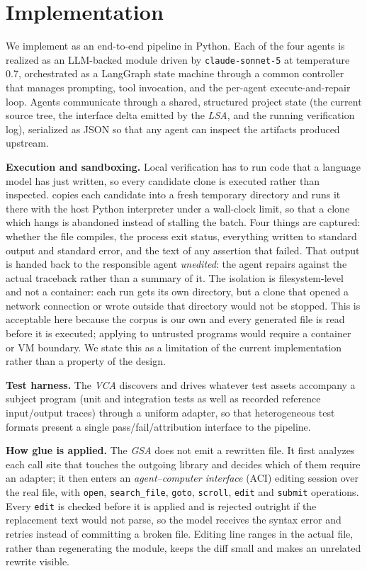 \section{Implementation}
\label{sec:impl}

We implement \sys as an end-to-end pipeline in Python. Each of the four agents is realized as an LLM-backed module driven by \texttt{claude-sonnet-5} at temperature 0.7, orchestrated as a LangGraph state machine through a common controller that manages prompting, tool invocation, and the per-agent execute-and-repair loop. Agents communicate through a shared, structured project state (the current source tree, the interface delta emitted by the \emph{LSA}, and the running verification log), serialized as JSON so that any agent can inspect the artifacts produced upstream.

\textbf{Execution and sandboxing.}
Local verification has to run code that a language model has just written, so every candidate clone is executed rather than inspected. \sys copies each candidate into a fresh temporary directory and runs it there with the host Python interpreter under a wall-clock limit, so that a clone which hangs is abandoned instead of stalling the batch. Four things are captured: whether the file compiles, the process exit status, everything written to standard output and standard error, and the text of any assertion that failed. That output is handed back to the responsible agent \emph{unedited}: the agent repairs against the actual traceback rather than a summary of it. The isolation is filesystem-level and not a container: each run gets its own directory, but a clone that opened a network connection or wrote outside that directory would not be stopped. This is acceptable here because the corpus is our own and every generated file is read before it is executed; applying \sys to untrusted programs would require a container or VM boundary. We state this as a limitation of the current implementation rather than a property of the design.

\textbf{Test harness.}
The \emph{VCA} discovers and drives whatever test assets accompany a subject program (unit and integration tests as well as recorded reference input/output traces) through a uniform adapter, so that heterogeneous test formats present a single pass/fail/attribution interface to the pipeline.

\textbf{How glue is applied.}
The \emph{GSA} does not emit a rewritten file. It first analyzes each call site that touches the outgoing library and decides which of them require an adapter; it then enters an \emph{agent--computer interface} (ACI) editing session over the real file, with \texttt{open}, \texttt{search\_file}, \texttt{goto}, \texttt{scroll}, \texttt{edit} and \texttt{submit} operations. Every \texttt{edit} is checked before it is applied and is rejected outright if the replacement text would not parse, so the model receives the syntax error and retries instead of committing a broken file. Editing line ranges in the actual file, rather than regenerating the module, keeps the diff small and makes an unrelated rewrite visible.

